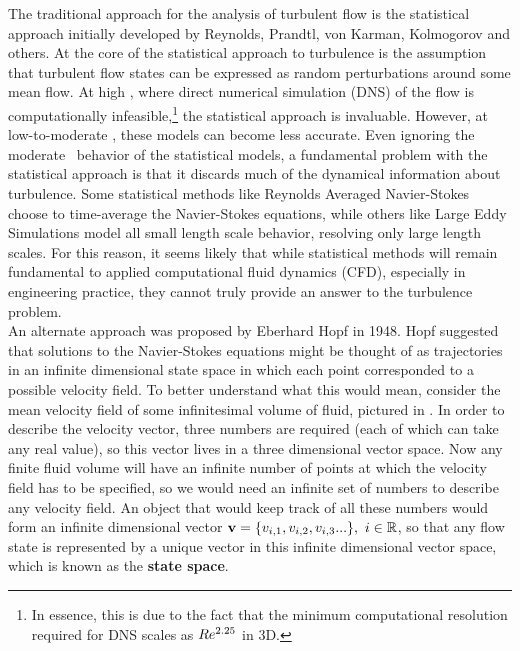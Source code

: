 The traditional approach for the analysis of turbulent flow is the statistical approach initially developed by Reynolds, Prandtl, von Karman, Kolmogorov and others. At the core of the statistical approach to turbulence is the assumption that turbulent flow states can be expressed as random perturbations around some mean flow. At high \ReN, where direct numerical simulation (DNS) of the flow is computationally infeasible,\footnote{In essence, this is due to the fact that the minimum computational resolution required for DNS scales as $Re^{2.25}$ in 3D.}  the statistical approach is invaluable. However, at low-to-moderate \ReN, these models can become less accurate. Even ignoring the moderate \ReN\ behavior of the statistical models, a fundamental problem with the statistical approach is that it discards much of the dynamical information about turbulence. Some statistical methods like Reynolds Averaged Navier-Stokes choose to time-average the Navier-Stokes equations, while others like Large Eddy Simulations model all small length scale behavior, resolving only large length scales. For this reason, it seems likely that while statistical methods will remain fundamental to applied computational fluid dynamics (CFD), especially in engineering practice, they cannot truly provide an answer to the turbulence problem. \\

An alternate approach was proposed by Eberhard Hopf in 1948. Hopf suggested that solutions to the Navier-Stokes equations might be thought of as trajectories in an infinite dimensional state space in which each point corresponded to a possible velocity field. To better understand what this would mean, consider the mean velocity field of some infinitesimal volume of fluid, pictured in . In order to describe the velocity vector, three numbers are required (each of which can take any real value), so this vector lives in a three dimensional vector space. Now any finite fluid volume will have an infinite number of points at which the velocity field has to be specified, so we would need an infinite set of numbers to describe any velocity field. An object that would keep track of all these numbers would form an infinite dimensional vector $\mathbf{v} = \{v_{i,1},v_{i,2},v_{i,3}...\},~i \in \mathbb{R}$, so that any flow state is represented by a unique vector in this infinite dimensional vector space, which is known as the {\bf state space}. 


